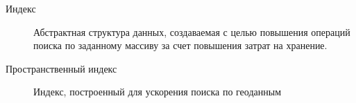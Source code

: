   \Defines %
\begin{description}
    \item[Индекс] Абстрактная структура данных, создаваемая с целью повышения операций поиска по заданному массиву за счет повышения затрат на хранение. 
    \item[Пространственный индекс] Индекс, построенный для ускорения поиска по геоданным
\end{description}

